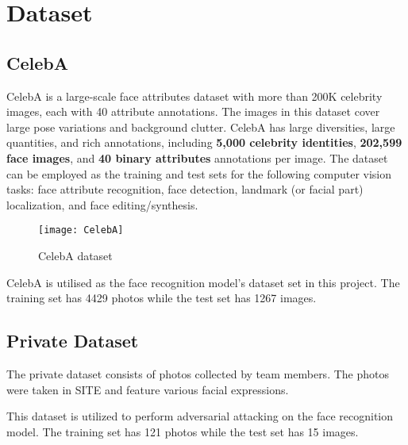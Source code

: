 \section{Dataset}

\subsection{CelebA} \label{sec:CelebA}

CelebA is a large-scale face attributes dataset with more than 200K celebrity images, each with 40 attribute annotations. The images in this dataset cover large pose variations and background clutter. CelebA has large diversities, large quantities, and rich annotations, including \textbf{5,000 celebrity identities}, \textbf{202,599 face images}, and \textbf{40 binary attributes} annotations per image. The dataset can be employed as the training and test sets for the following computer vision tasks: face attribute recognition, face detection, landmark (or facial part) localization, and face editing/synthesis.

\begin{figure}[h]
\centering
\texttt{[image: CelebA]}
\caption{CelebA dataset}
\label{fig:CelebA}
\end{figure}

CelebA is utilised as the face recognition model's dataset set in this project. The training set has 4429 photos while the test set has 1267 images.

\subsection{Private Dataset}

The private dataset consists of photos collected by team members. The photos were taken in SITE and feature various facial expressions.

This dataset is utilized to perform adversarial attacking on the face recognition model. The training set has 121 photos while the test set has 15 images.

